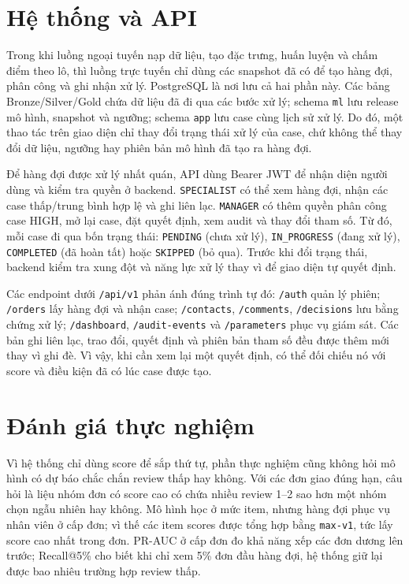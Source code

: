 \section{Hệ thống và API}\label{sec:system-api}

Trong khi luồng ngoại tuyến nạp dữ liệu, tạo đặc trưng, huấn luyện và chấm điểm theo lô, thì luồng trực tuyến chỉ dùng các snapshot đã có để tạo hàng đợi, phân công và ghi nhận xử lý. PostgreSQL là nơi lưu cả hai phần này. Các bảng Bronze/Silver/Gold chứa dữ liệu đã đi qua các bước xử lý; schema \texttt{ml} lưu release mô hình, snapshot và ngưỡng; schema \texttt{app} lưu case cùng lịch sử xử lý. Do đó, một thao tác trên giao diện chỉ thay đổi trạng thái xử lý của case, chứ không thể thay đổi dữ liệu, ngưỡng hay phiên bản mô hình đã tạo ra hàng đợi.

Để hàng đợi được xử lý nhất quán, API dùng Bearer JWT để nhận diện người dùng và kiểm tra quyền ở backend. \texttt{SPECIALIST} có thể xem hàng đợi, nhận các case thấp/trung bình hợp lệ và ghi liên lạc. \texttt{MANAGER} có thêm quyền phân công case HIGH, mở lại case, đặt quyết định, xem audit và thay đổi tham số. Từ đó, mỗi case đi qua bốn trạng thái: \texttt{PENDING} (chưa xử lý), \texttt{IN\_PROGRESS} (đang xử lý), \texttt{COMPLETED} (đã hoàn tất) hoặc \texttt{SKIPPED} (bỏ qua). Trước khi đổi trạng thái, backend kiểm tra xung đột và năng lực xử lý thay vì để giao diện tự quyết định.

Các endpoint dưới \texttt{/api/v1} phản ánh đúng trình tự đó: \texttt{/auth} quản lý phiên; \texttt{/orders} lấy hàng đợi và nhận case; \texttt{/contacts}, \texttt{/comments}, \texttt{/decisions} lưu bằng chứng xử lý; \texttt{/dashboard}, \texttt{/audit-events} và \texttt{/parameters} phục vụ giám sát. Các bản ghi liên lạc, trao đổi, quyết định và phiên bản tham số đều được thêm mới thay vì ghi đè. Vì vậy, khi cần xem lại một quyết định, có thể đối chiếu nó với score và điều kiện đã có lúc case được tạo.

\section{Đánh giá thực nghiệm}

Vì hệ thống chỉ dùng score để sắp thứ tự, phần thực nghiệm cũng không hỏi mô hình có dự báo chắc chắn review thấp hay không. Với các đơn giao đúng hạn, câu hỏi là liệu nhóm đơn có score cao có chứa nhiều review 1--2 sao hơn một nhóm chọn ngẫu nhiên hay không. Mô hình học ở mức item, nhưng hàng đợi phục vụ nhân viên ở cấp đơn; vì thế các item scores được tổng hợp bằng \texttt{max-v1}, tức lấy score cao nhất trong đơn. PR-AUC ở cấp đơn đo khả năng xếp các đơn dương lên trước; Recall@5\% cho biết khi chỉ xem 5\% đơn đầu hàng đợi, hệ thống giữ lại được bao nhiêu trường hợp review thấp.

